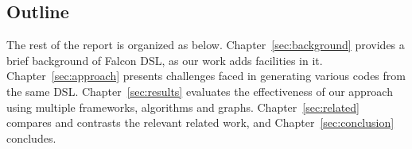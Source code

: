 \subsection{Outline}
The rest of the report is organized as below.
Chapter~\ref{sec:background} provides a brief background of Falcon DSL, as our work adds facilities in it.
Chapter~\ref{sec:approach} presents challenges faced in generating various codes from the same DSL.
Chapter~\ref{sec:results} evaluates the effectiveness of our approach using multiple frameworks, algorithms and graphs.
Chapter~\ref{sec:related} compares and contrasts the relevant related work,
and Chapter~\ref{sec:conclusion} concludes.
